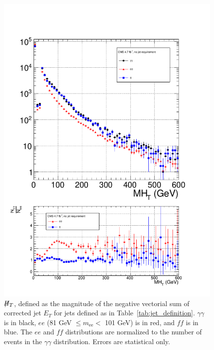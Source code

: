 \documentclass[dissertation_bw.tex]{subfiles}
\begin{document}
\begin{figure}
	\centering
	\includegraphics[scale=0.5]{hadronic_activity_MHT}
	\caption{$\not\!\! H_{T}$, defined as the magnitude of the negative vectorial sum of corrected jet $E_{T}$ for jets defined as in Table~\ref{tab:jet_definition}.  $\gamma\gamma$ is in black, $ee$ (81 GeV $\leq m_{\mathrm{ee}} <$ 101 GeV) is in red, and $\mathit{ff}$ is in blue.  The $ee$ and $\mathit{ff}$ distributions are normalized to the number of events in the $\gamma\gamma$ distribution.  Errors are statistical only.}
	\label{fig:hadronic_activity_MHT}
\end{figure}
\end{document}
